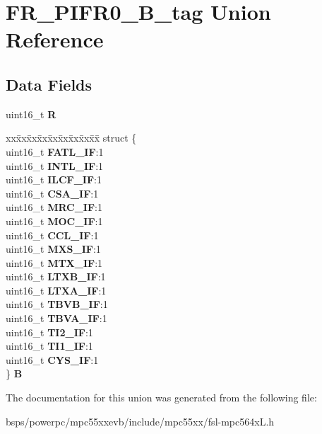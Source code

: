 \hypertarget{unionFR__PIFR0__16B__tag}{}\section{F\+R\+\_\+\+P\+I\+F\+R0\+\_\+B\+\_\+tag Union Reference}
\label{unionFR__PIFR0__16B__tag}
\subsection*{Data Fields}
\begin{DoxyCompactItemize}
\item 
\mbox{\label{unionFR__PIFR0__16B__tag_a2a7e45d17b9addd6b917116de3293acb}} 
uint16\+\_\+t {\bfseries R}
\item 
\mbox{\label{unionFR__PIFR0__16B__tag_a4739d5e119aa28034df9017d81168dbc}} 
\begin{tabbing}
xx\=xx\=xx\=xx\=xx\=xx\=xx\=xx\=xx\=\kill
struct \{\\
\>uint16\_t {\bfseries FATL\_IF}:1\\
\>uint16\_t {\bfseries INTL\_IF}:1\\
\>uint16\_t {\bfseries ILCF\_IF}:1\\
\>uint16\_t {\bfseries CSA\_IF}:1\\
\>uint16\_t {\bfseries MRC\_IF}:1\\
\>uint16\_t {\bfseries MOC\_IF}:1\\
\>uint16\_t {\bfseries CCL\_IF}:1\\
\>uint16\_t {\bfseries MXS\_IF}:1\\
\>uint16\_t {\bfseries MTX\_IF}:1\\
\>uint16\_t {\bfseries LTXB\_IF}:1\\
\>uint16\_t {\bfseries LTXA\_IF}:1\\
\>uint16\_t {\bfseries TBVB\_IF}:1\\
\>uint16\_t {\bfseries TBVA\_IF}:1\\
\>uint16\_t {\bfseries TI2\_IF}:1\\
\>uint16\_t {\bfseries TI1\_IF}:1\\
\>uint16\_t {\bfseries CYS\_IF}:1\\
\} {\bfseries B}\\

\end{tabbing}\end{DoxyCompactItemize}


The documentation for this union was generated from the following file\+:\begin{DoxyCompactItemize}
\item 
bsps/powerpc/mpc55xxevb/include/mpc55xx/fsl-\/mpc564x\+L.\+h\end{DoxyCompactItemize}

